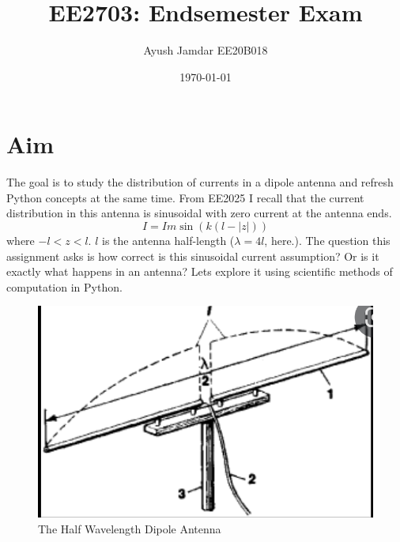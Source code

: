 \documentclass[11pt, a4paper]{article}
\title{EE2703: Endsemester Exam}
\author{Ayush Jamdar EE20B018} %
\date{\today} %
\begin{document}
		
		
\maketitle %
\section{Aim}
The goal is to study the distribution of currents in a dipole antenna and refresh Python concepts at the same time. From EE2025 I recall that the current distribution in this antenna is sinusoidal with zero current at the antenna ends. 
$$I = Im\sin(k(l-|z|))$$
where $-l<z<l$. $l$ is the antenna half-length ($\lambda = 4l$, here.). 
The question this assignment asks is how correct is this sinusoidal current assumption? Or is it exactly what happens in an antenna? Lets explore it using scientific methods of computation in Python.

\begin{figure}[!tbh]
   	\centering
  \includegraphics[scale=0.5]{antenna.png} 
    \caption{The Half Wavelength Dipole Antenna} 	
\end{figure}  
\end{document}
